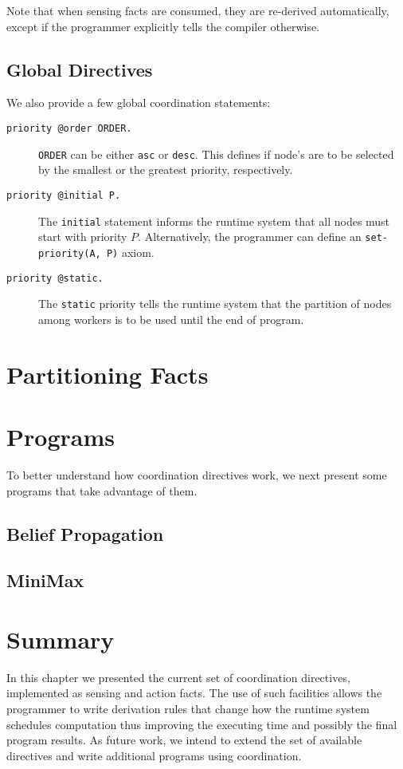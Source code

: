 Note that when sensing facts are consumed, they are re-derived automatically, except if the programmer explicitly tells the compiler otherwise. 

\subsection{Global Directives}

We also provide a few global coordination statements:

\begin{description}
   \item[\texttt{priority @order ORDER.}] \texttt{ORDER} can be either \texttt{asc} or \texttt{desc}. This defines if node's are to be selected by the smallest or the greatest priority, respectively.
   \item[\texttt{priority @initial P.}] The \texttt{initial} statement informs the runtime system that all nodes must start with priority $P$. Alternatively, the programmer can define an \texttt{set-priority(A, P)} axiom.
   \item[\texttt{priority @static.}] The \texttt{static} priority tells the runtime system that the partition of nodes among workers is to be used until the end of program. 
\end{description}

\section{Partitioning Facts}

\section{Programs}

To better understand how coordination directives work, we next present some programs that
take advantage of them.

\subsection{Belief Propagation}

\subsection{MiniMax}
\section{Summary}

In this chapter we presented the current set of coordination directives, implemented as sensing and action facts. The use of such facilities allows the programmer to write derivation rules that change how
the runtime system schedules computation thus improving the executing time and possibly the final program
results. As future work, we intend to extend the set of available directives and write additional programs using coordination.

